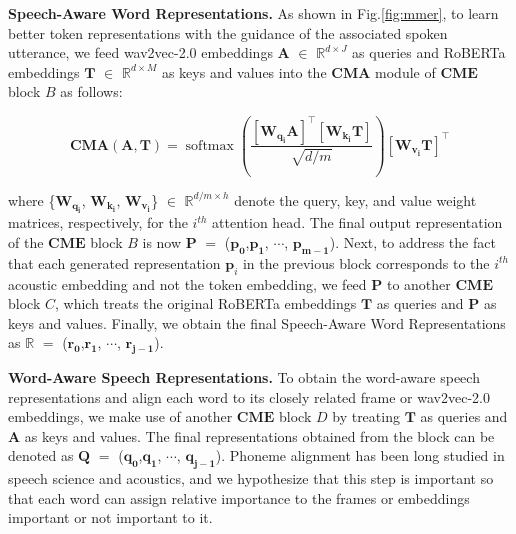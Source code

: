 \documentclass{INTERSPEECH2023}
\begin{document}
{\noindent \textbf{Speech-Aware Word Representations.}} As shown in Fig.\ref{fig:mmer}, to learn better token representations with the guidance of the associated spoken utterance, we feed wav2vec-2.0 embeddings $\mathbf{A}$ $\in$ $\mathbb{R}^{d \times J}$ as queries and RoBERTa embeddings $\mathbf{T}$ $\in$ $\mathbb{R}^{d \times M}$ as keys and values into the $\mathbf{CMA}$ module of $\mathbf{CME}$ block $B$ as follows:

\begin{equation}
    \mathbf{CMA}(\mathbf{A}, \mathbf{T})=\operatorname{softmax}\left(\frac{\left[\mathbf{W}_{\mathbf{q}_{\mathbf{i}}} \mathbf{A}\right]^{\top}\left[\mathbf{W}_{\mathbf{k}_{\mathbf{i}}} \mathbf{T}\right]}{\sqrt{d / m}}\right)\left[\mathbf{W}_{\mathbf{v}_{\mathbf{i}}} \mathbf{T}\right]^{\top}
\end{equation}

where \{$\mathbf{W}_{\mathbf{q}_{\mathbf{i}}}$, $\mathbf{W}_{\mathbf{k}_{\mathbf{i}}}$, $\mathbf{W}_{\mathbf{v}_{\mathbf{i}}}$\} $\in$ $\mathbb{R}^{d/m \times h}$ denote the query, key, and value weight matrices, respectively, for the $i^{th}$ attention head. The final output representation of the $\mathbf{CME}$ block $B$ is now $\mathbf{P}$ $=$ ($\mathbf{p_0}$,$\mathbf{p_1}$, $\cdots$, $\mathbf{p_{m-1}}$). Next, to address the fact that each generated representation $\mathbf{p}_i$ in the previous block corresponds to the $i^{th}$ acoustic embedding and not the token embedding, we feed $\mathbf{P}$ to another $\mathbf{CME}$ block $C$, which treats the original RoBERTa embeddings $\mathbf{T}$ as queries and $\mathbf{P}$ as keys and values. Finally, we obtain the final Speech-Aware Word Representations as $\mathbb{R}$ $=$ ($\mathbf{r_0}$,$\mathbf{r_1}$, $\cdots$, $\mathbf{r_{j-1}}$).
\vspace{1mm}

{\noindent \textbf{Word-Aware Speech Representations.}} To obtain the word-aware speech representations and align each word to its closely related frame or wav2vec-2.0 embeddings, we make use of another $\mathbf{CME}$ block $D$ by treating $\mathbf{T}$ as queries and $\mathbf{A}$ as keys and values. The final representations obtained from the block can be denoted as $\mathbf{Q}$ $=$ ($\mathbf{q_0}$,$\mathbf{q_1}$, $\cdots$, $\mathbf{q_{j-1}}$). Phoneme alignment has been long studied in speech science and acoustics, and we hypothesize that this step is important so that each word can assign relative importance to the frames or embeddings important or not important to it.
\vspace{1mm}
\end{document}
